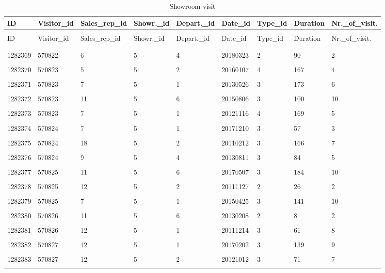 \documentclass[letterpaper,12pt]{article}
\begin{document}
\begingroup
\renewcommand\arraystretch{0.5}
\begin{longtable}{p{1.4cm}p{1.5cm}p{1.8cm}p{1.5cm}p{1.6cm}p{1.4cm}p{1.2cm}p{1.25cm}p{1.85cm}}
        \caption{Showroom visit} \\
        ID & Visitor\_id & Sales\_rep\_id & Showr.\_id & Depart.\_id & Date\_id & Type\_id & Duration & Nr.\_of\_visit. \\
        \endfirsthead \\
        ID & Visitor\_id & Sales\_rep\_id & Showr.\_id & Depart.\_id & Date\_id & Type\_id & Duration & Nr.\_of\_visit. \\
        \endhead \\
        \hline \\
        1282369	& \color{red} 570822 & 6 & \color{red} 5 & 4 & \color{red}20180323 & 2 & 90 & 2 \\
        \hline \\
        1282370	& 570823 & 5 & 5 & 2 & 20160107 & 4 & 167 & 4 \\
        \hline \\
        1282371	& 570823 & 7 & 5 & 1 & 20130526 & 3 & 173 & 6 \\
        \hline \\
        1282372	& 570823 & 11 & 5 & 6 & 20150806  & 3 & 100 & 10 \\
        \hline \\
        1282373	& 570823 & 7 & 5 & 1 & 20121116 & 4 & 169 & 5 \\
        \hline \\
        1282374	& 570824 & 7 & 5 & 1 & 20171210 & 3 & 57 & 3 \\
        \hline \\
        1282375	& 570824 & 18 & 5 & 2 & 20110212 & 3 & 166 & 7 \\
        \hline \\
        1282376	& 570824 & 9 & 5 & 4 & 20130811  & 3 & 84 & 5 \\
        \hline \\
        1282377	& 570825 & 11 & 5 & 6 & 20170507 & 3 & 184 & 10 \\
        \hline \\
        1282378	& 570825 & 12 & 5 & 2 & 20111127 & 2 & 26 & 2 \\
        \hline \\
        1282379	& 570825 & 7 & 5 & 1 & 20150425 & 3 & 141 & 10 \\
        \hline \\
        1282380	& 570826 & 11 & 5 & 6 & 20130208 & 2 & 8 & 2 \\
        \hline \\
        1282381	& 570826 & 12 & 5 & 1 & 20111214 & 3 & 61 & 8 \\
        \hline \\
        1282382	& 570827 & 12 & 5 & 1 & 20170202 & 3 & 139 & 9 \\
        \hline \\
        1282383 & 570827 & 12 & 5 & 2 & 20121012 & 3 & 71 & 7 \\
        \hline \\
\end{longtable}
\endgroup
\end{document}
